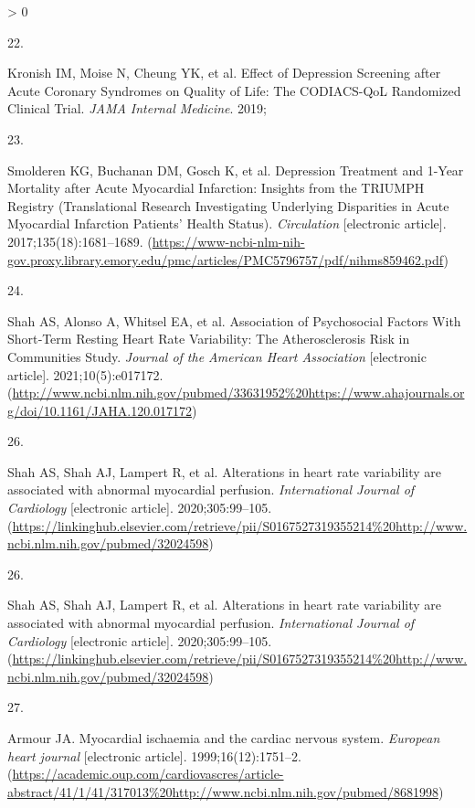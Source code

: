\documentclass[
  11pt,
  openany]{book}
\newlength{\cslhangindent}
\newlength{\csllabelwidth}
\newenvironment{CSLReferences}[2] %
 {%
  \setlength{\parindent}{0pt}
  \ifodd #1 \everypar{\setlength{\hangindent}{\cslhangindent}}\ignorespaces\fi
  \ifnum #2 > 0
  \setlength{\parskip}{#2\baselineskip}
  \fi
 }%
 {}
\newcommand{\CSLLeftMargin}[1]{\parbox[t]{\csllabelwidth}{#1}}
\newcommand{\CSLRightInline}[1]{\parbox[t]{\linewidth - \csllabelwidth}{#1}\break}
\begin{document}
\begin{CSLReferences}{0}{0}
\leavevmode\hypertarget{ref-Kronish2019}{}%
\CSLLeftMargin{22. }
\CSLRightInline{Kronish IM, Moise N, Cheung YK, et al. {Effect of Depression Screening after Acute Coronary Syndromes on Quality of Life: The CODIACS-QoL Randomized Clinical Trial}. \emph{JAMA Internal Medicine}. 2019;}

\leavevmode\hypertarget{ref-Smolderen2017}{}%
\CSLLeftMargin{23. }
\CSLRightInline{Smolderen KG, Buchanan DM, Gosch K, et al. {Depression Treatment and 1-Year Mortality after Acute Myocardial Infarction: Insights from the TRIUMPH Registry (Translational Research Investigating Underlying Disparities in Acute Myocardial Infarction Patients' Health Status)}. \emph{Circulation} {[}electronic article{]}. 2017;135(18):1681--1689. (\url{https://www-ncbi-nlm-nih-gov.proxy.library.emory.edu/pmc/articles/PMC5796757/pdf/nihms859462.pdf})}

\leavevmode\hypertarget{ref-Shah2021a}{}%
\CSLLeftMargin{24. }
\CSLRightInline{Shah AS, Alonso A, Whitsel EA, et al. {Association of Psychosocial Factors With Short‐Term Resting Heart Rate Variability: The Atherosclerosis Risk in Communities Study}. \emph{Journal of the American Heart Association} {[}electronic article{]}. 2021;10(5):e017172. (\url{http://www.ncbi.nlm.nih.gov/pubmed/33631952\%20https://www.ahajournals.org/doi/10.1161/JAHA.120.017172})}

\leavevmode\hypertarget{ref-Shah2020}{}%
\CSLLeftMargin{26. }
\CSLRightInline{Shah AS, Shah AJ, Lampert R, et al. {Alterations in heart rate variability are associated with abnormal myocardial perfusion.} \emph{International Journal of Cardiology} {[}electronic article{]}. 2020;305:99--105. (\url{https://linkinghub.elsevier.com/retrieve/pii/S0167527319355214\%20http://www.ncbi.nlm.nih.gov/pubmed/32024598})}

\leavevmode\hypertarget{ref-Shah2020}{}%
\CSLLeftMargin{26. }
\CSLRightInline{Shah AS, Shah AJ, Lampert R, et al. {Alterations in heart rate variability are associated with abnormal myocardial perfusion.} \emph{International Journal of Cardiology} {[}electronic article{]}. 2020;305:99--105. (\url{https://linkinghub.elsevier.com/retrieve/pii/S0167527319355214\%20http://www.ncbi.nlm.nih.gov/pubmed/32024598})}

\leavevmode\hypertarget{ref-Armour1999}{}%
\CSLLeftMargin{27. }
\CSLRightInline{Armour JA. {Myocardial ischaemia and the cardiac nervous system.} \emph{European heart journal} {[}electronic article{]}. 1999;16(12):1751--2. (\url{https://academic.oup.com/cardiovascres/article-abstract/41/1/41/317013\%20http://www.ncbi.nlm.nih.gov/pubmed/8681998})}


\end{CSLReferences}
\end{document}
